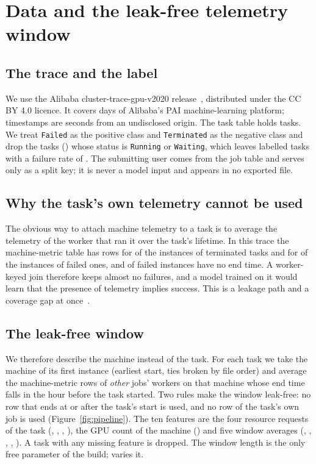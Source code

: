 \section{Data and the leak-free telemetry window}
\label{sec:data}

\subsection{The trace and the label}
We use the Alibaba cluster-trace-gpu-v2020 release~\cite{weng2022mlaas}, distributed under the CC BY 4.0 licence. It covers  days of Alibaba's PAI machine-learning platform; timestamps are seconds from an undisclosed origin. The task table holds  tasks. We treat \texttt{Failed} as the positive class and \texttt{Terminated} as the negative class and drop the  tasks () whose status is \texttt{Running} or \texttt{Waiting}, which leaves  labelled tasks with a failure rate of . The submitting user comes from the job table and serves only as a split key; it is never a model input and appears in no exported file.

\subsection{Why the task's own telemetry cannot be used}
The obvious way to attach machine telemetry to a task is to average the telemetry of the worker that ran it over the task's lifetime. In this trace the machine-metric table has rows for  of the instances of terminated tasks and for  of the instances of failed ones, and  of failed instances have no end time. A worker-keyed join therefore keeps almost no failures, and a model trained on it would learn that the presence of telemetry implies success. This is a leakage path and a coverage gap at once~\cite{kaufman2012leakage,kapoor2023leakage}.

\subsection{The leak-free window}
We therefore describe the machine instead of the task. For each task we take the machine of its first instance (earliest start, ties broken by file order) and average the machine-metric rows of \emph{other} jobs' workers on that machine whose end time falls in the hour before the task started. Two rules make the window leak-free: no row that ends at or after the task's start is used, and no row of the task's own job is used (Figure~\ref{fig:pipeline}). The ten features are the four resource requests of the task (, , , ), the GPU count of the machine () and five window averages (, , , , ). A task with any missing feature is dropped. The window length is the only free parameter of the build;  varies it.

